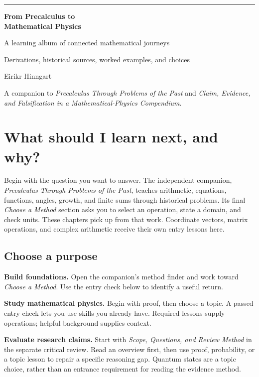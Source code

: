\documentclass[14pt,oneside]{extbook}
\theoremstyle{definition}
\begin{document}
\frontmatter
\begin{titlepage}
\color{learnink}
\vspace*{0.12\textheight}
{\color{learnnavy}\rule{\linewidth}{1.2pt}}\par
\vspace{1em}
{\Huge\bfseries From Precalculus to\\[0.3em]Mathematical Physics\par}
\vspace{1em}
{\Large A learning album of connected mathematical journeys\par}
\vspace{1em}
{\large Derivations, historical sources, worked examples, and choices\par}
\vfill
{\large Eirikr Hinngart\par}
\medskip
A companion to \emph{Precalculus Through Problems of the Past} and
\emph{Claim, Evidence, and Falsification in a Mathematical-Physics Compendium}.
\end{titlepage}
\chapter*{What should I learn next, and why?}
\label{learn:routes}
Begin with the question you want to answer. The independent companion,
\emph{Precalculus Through Problems of the Past}, teaches arithmetic, equations,
functions, angles, growth, and finite sums through historical problems.
Its final \emph{Choose a Method} section asks you to select an operation,
state a domain, and check units. These chapters pick up from that work.
Coordinate vectors, matrix operations, and complex arithmetic receive their
own entry lessons here.

\section*{Choose a purpose}
\textbf{Build foundations.} Open the companion's method finder and work toward
\emph{Choose a Method}. Use the entry check below to identify a useful return.
\par\textbf{Study mathematical physics.} Begin with proof, then choose a topic.
A passed entry check lets you use skills you already have. Required lessons
supply operations; helpful background supplies context.
\par\textbf{Evaluate research claims.} Start with \emph{Scope, Questions, and
Review Method} in the separate critical review. Read an overview first, then
use proof, probability, or a topic lesson to repair a specific reasoning gap.
Quantum states are a topic choice, rather than an entrance requirement for
reading the evidence method.
\end{document}
